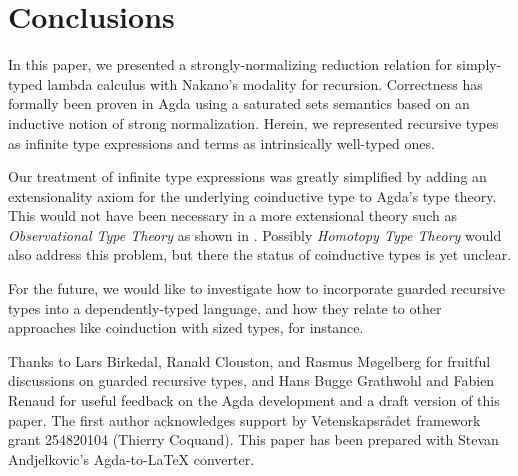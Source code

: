 
\section{Conclusions}
\label{sec:concl}

In this paper, we presented a strongly-normalizing reduction relation
for simply-typed lambda calculus with Nakano's modality for
recursion.  Correctness has formally been proven in Agda using a
saturated sets semantics based on an inductive notion of strong
normalization.  Herein, we represented recursive types as infinite
type expressions and terms as intrinsically well-typed ones.  

Our treatment of infinite type expressions was greatly simplified by
adding an extensionality axiom for the underlying coinductive type to
Agda's type theory.  This would not have been necessary in a more
extensional theory such as \emph{Observational Type Theory}
\citep{altenkirchMcBrideSwierstra:plpv07} as shown in \citep{mcBride:unfold}.  Possibly \emph{Homotopy Type
Theory} \citep{hott} 
would also address this problem, but there the status of
coinductive types is yet unclear.

For the future, we would like to investigate how to incorporate
guarded recursive types into a dependently-typed language, and how
they relate to other approaches like coinduction with sized
types, for instance.

Thanks to Lars Birkedal, Ranald Clouston, and Rasmus M\o{}gelberg for
fruitful discussions on guarded recursive types, and Hans Bugge
Grathwohl and Fabien Renaud for useful feedback on the Agda
development and a draft version of this paper.
The first author acknowledges support by Vetenskapsr\aa{}det framework
grant 254820104 (Thierry Coquand).  This paper has been prepared with
Stevan Andjelkovic's Agda-to-LaTeX converter. 


